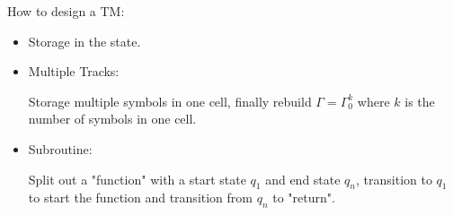     How to design a TM:
    \begin{itemize}
        \item Storage in the state.
        \item Multiple Tracks:
            
            Storage multiple symbols in one cell, finally rebuild $\Gamma=\Gamma_0^{k}$ where $k$ is the number of symbols in one cell.
        \item Subroutine:

            Split out a "function" with a start state $q_1$ and end state $q_{n}$, transition to $q_1$ to start the function and transition from $q_{n}$ to "return".
    \end{itemize}

